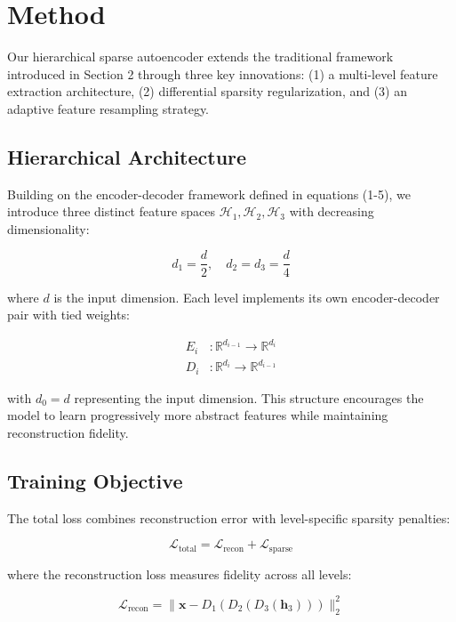 \section{Method}

Our hierarchical sparse autoencoder extends the traditional framework introduced in Section 2 through three key innovations: (1) a multi-level feature extraction architecture, (2) differential sparsity regularization, and (3) an adaptive feature resampling strategy.

\subsection{Hierarchical Architecture}
Building on the encoder-decoder framework defined in equations (1-5), we introduce three distinct feature spaces $\mathcal{H}_1, \mathcal{H}_2, \mathcal{H}_3$ with decreasing dimensionality:

\begin{equation}
d_1 = \frac{d}{2}, \quad d_2 = d_3 = \frac{d}{4}
\end{equation}

where $d$ is the input dimension. Each level implements its own encoder-decoder pair with tied weights:

\begin{align}
E_i &: \mathbb{R}^{d_{i-1}} \rightarrow \mathbb{R}^{d_i} \\
D_i &: \mathbb{R}^{d_i} \rightarrow \mathbb{R}^{d_{i-1}}
\end{align}

with $d_0 = d$ representing the input dimension. This structure encourages the model to learn progressively more abstract features while maintaining reconstruction fidelity.

\subsection{Training Objective}
The total loss combines reconstruction error with level-specific sparsity penalties:

\begin{equation}
\mathcal{L}_\text{total} = \mathcal{L}_\text{recon} + \mathcal{L}_\text{sparse}
\end{equation}

where the reconstruction loss measures fidelity across all levels:

\begin{equation}
\mathcal{L}_\text{recon} = \|\mathbf{x} - D_1(D_2(D_3(\mathbf{h}_3)))\|_2^2
\end{equation}

